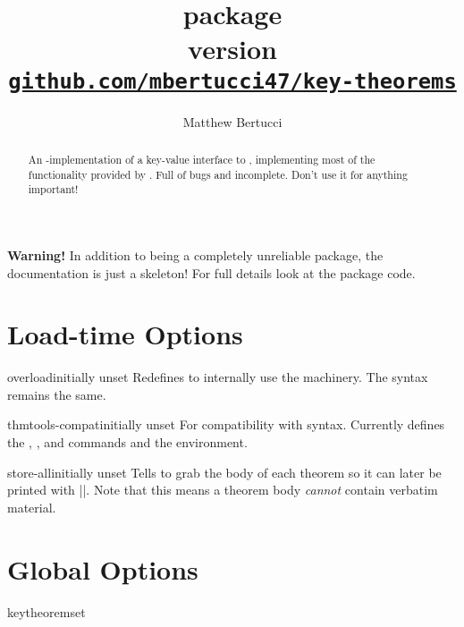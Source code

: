 \documentclass{ltxdoc}
\title{
	\pkg{key-theorems} package \\[1ex]
	\large version \version \\[1ex]
	\href{https://github.com/mbertucci47/key-theorems}
	  {\texttt{github.com/mbertucci47/key-theorems}}
	}
\author{Matthew Bertucci}
\begin{document}
\maketitle

\begin{abstract}
An -implementation of a key-value interface to , implementing most of the functionality provided by . Full of bugs and incomplete. Don't use it for anything important!
\end{abstract}

\begin{tcolorbox}[colframe=red,colback=red!10!white]
\textbf{Warning!} In addition to being a completely unreliable package, the documentation is just a skeleton! For full details look at the package code.
\end{tcolorbox}

\section{Load-time Options}

\begin{docKey}{overload}{}{initially unset}
Redefines  to internally use the  machinery. The syntax remains the same.
\end{docKey}

\begin{docKey}{thmtools-compat}{}{initially unset}
For compatibility with  syntax. Currently defines the , , and  commands and the  environment. 
\end{docKey}

\begin{docKey}{store-all}{}{initially unset}
Tells  to grab the body of each theorem so it can later be
printed with ||. Note that this means a theorem body
\emph{cannot} contain verbatim material.
\end{docKey}
    
\section{Global Options}

\begin{docCommand}{keytheoremset}{}

\end{docCommand}
\end{document}
